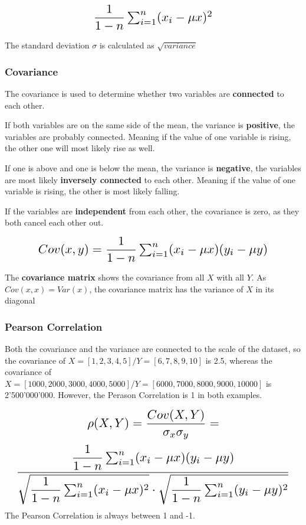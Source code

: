 \documentclass[a4paper, 11pt]{article}
\begin{document}
\[ \scalebox{1.5}{
        $\dfrac{1}{1-n} \sum^{n}_{i=1}(x_{i} - \mu x)^2$
}\]

The standard deviation $\sigma$ is calculated as $\sqrt{variance}$

\newpage

\subsubsection{Covariance}
The covariance is used to determine whether two variables are \textbf{connected} to each other. 

If both variables are on the same side of the mean, the variance is \textbf{positive}, the variables are probably connected. Meaning if the value of one variable is rising, the other one will most likely rise as well. 

If one is above and one is below the mean, the variance is \textbf{negative}, the variables are most likely \textbf{inversely connected} to each other. Meaning if the value of one variable is rising, the other is most likely falling.

If the variables are \textbf{independent} from each other, the covariance is zero, as they both cancel each other out.

\[\scalebox{1.5}{
        $Cov(x,y) = \dfrac{1}{1-n} \sum^{n}_{i=1}(x_{i} - \mu x)(y_{i} - \mu y)$
}\]

The \textbf{covariance matrix} shows the covariance from all $X$ with all $Y$. As $Cov(x,x) = Var(x)$, the covariance matrix has the variance of $X$ in its diagonal


\subsubsection{Pearson Correlation} \label{sec:pearson}
Both the covariance and the variance are connected to the scale of the dataset, so the covariance of $X=[1,2,3,4,5] / Y=[6,7,8,9,10]$ is 2.5, whereas the covariance of $X=[1000,2000,3000,4000,5000] / Y=[6000,7000,8000,9000,10000]$ is 2'500'000'000. However, the Perason Correlation is 1 in both examples.

\[\scalebox{1.5}{
        $\rho(X,Y)=\dfrac{Cov(X,Y)}{\sigma_{x} \sigma_{y}} = $

}\] 
\[\scalebox{1.5}{
        $        \dfrac{\dfrac{1}{1-n} \sum^{n}_{i=1}(x_{i} - \mu x)(y_{i} - \mu y)}{\sqrt{\dfrac{1}{1-n} \sum^{n}_{i=1}(x_{i} - \mu x)^2} \cdot \sqrt{\dfrac{1}{1-n} \sum^{n}_{i=1}(y_{i} - \mu y)^2}}$
}\]
The Pearson Correlation is always between 1 and -1. 
\end{document}

